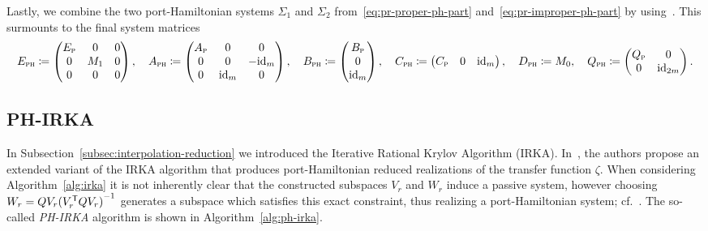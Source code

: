 Lastly, we combine the two port-Hamiltonian systems $\Sigma_1$ and $\Sigma_2$ from~\eqref{eq:pr-proper-ph-part} and~\eqref{eq:pr-improper-ph-part} by using~\cite[Lemma~5.6]{CGH2022}.
This surmounts to the final system matrices
\begin{equation*}
    E_\msc{ph} \coloneqq \begin{pmatrix}
        E_\msc{p} & 0 & 0 \\
        0 & M_1 & 0 \\
        0 & 0 & 0
    \end{pmatrix},\quad A_\msc{ph} \coloneqq \begin{pmatrix}
        A_\msc{p} & 0 & 0 \\
        0 & 0 & -\id[m] \\
        0 & \id[m] & 0
    \end{pmatrix},\quad B_\msc{ph} \coloneqq \begin{pmatrix}
        B_\msc{p} \\
        0 \\
        \id[m]
    \end{pmatrix},\quad C_\msc{ph} \coloneqq \begin{pmatrix}
        C_\msc{p} & 0 & \id[m]
    \end{pmatrix},\quad D_\msc{ph} \coloneqq M_0,\quad Q_\msc{ph} \coloneqq \begin{pmatrix}
        Q_\msc{p} & 0 \\
        0 & \id[2m]
    \end{pmatrix}.
\end{equation*}

\subsection{PH-IRKA}\label{subsec:ph-irka}

In Subsection~\ref{subsec:interpolation-reduction} we introduced the Iterative Rational Krylov Algorithm (IRKA).
In~\cite{Gugercin2012}, the authors propose an extended variant of the IRKA algorithm that produces port-Hamiltonian reduced realizations of the transfer function $\zeta$.
When considering Algorithm~\ref{alg:irka} it is not inherently clear that the constructed subspaces $V_r$ and $W_r$ induce a passive system, however choosing $W_r = Q V_r {(V_r\trans Q V_r)}\inv$ generates a subspace which satisfies this exact constraint, thus realizing a port-Hamiltonian system; cf.~\cite[Section~2.4]{Breiten2022}.
The so-called \emph{PH-IRKA} algorithm is shown in Algorithm~\ref{alg:ph-irka}.

